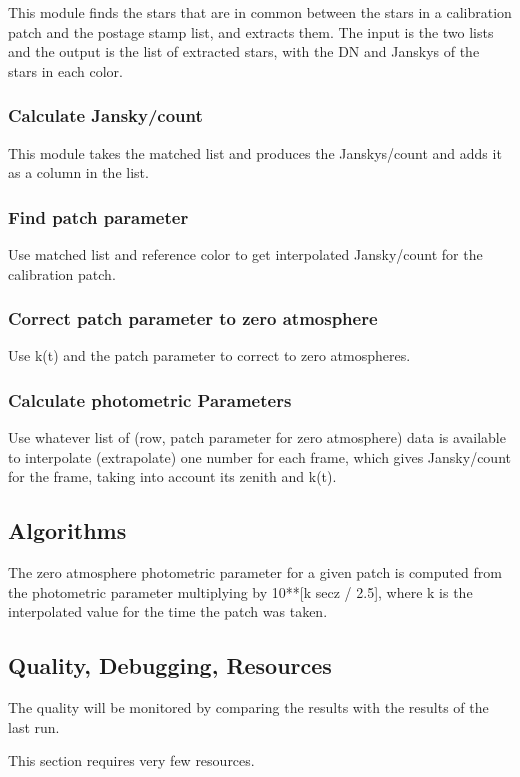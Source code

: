 This module finds the stars that are in common between the stars in a 
calibration patch and the postage stamp list, and extracts them.  The input 
is the two lists and the output is the list of extracted stars, with the DN
and Janskys of the stars in each color.

\subsubsection{Calculate Jansky/count}

This module takes the matched list and produces
the Janskys/count and adds it as a column in the list.

\subsubsection{Find patch parameter}

Use matched list and reference color to get interpolated Jansky/count for
the calibration patch.

\subsubsection{Correct patch parameter to zero atmosphere}

Use k(t) and the patch parameter to correct to zero atmospheres.

\subsubsection{Calculate photometric Parameters}

Use whatever list of (row, patch parameter for zero atmosphere) data
is available to interpolate (extrapolate) one number for each frame,
which gives Jansky/count for the frame, taking into account its zenith
and k(t).

\subsection{Algorithms}

The zero atmosphere photometric parameter for a given patch is computed 
from the photometric parameter
multiplying by 10**[k secz / 2.5], where k is the
interpolated value for the time the patch was taken.

\subsection{Quality, Debugging, Resources}

The quality will be monitored by comparing the results with the
results of the last run.

This section requires very few resources.

